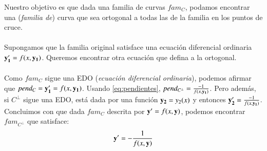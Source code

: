 Nuestro objetivo es que dada una familia de curvas $fam_{C}$, podamos encontrar una (\textit{familia de}) curva que sea ortogonal a todas las de la familia en los puntos de cruce.\\\\
Supongamos que la familia original satisface una ecuación diferencial ordinaria $\mathbf{y_1'} = f(x, \mathbf{y_1})$. Queremos encontrar otra ecuación que defina a la ortogonal.\\\\
Como $fam_{C}$ sigue una EDO (\textit{ecuación diferencial ordinaria}), podemos afirmar que $pend_{C} = \mathbf{y_1'} = f(x, \mathbf{y_1})$. Usando \ref{eq:pendientes}, $pend_{C^\perp} = \frac{-1}{f(x, \mathbf{y_1})}$. Pero además, si $C^\perp$ sigue una EDO, está dada por una función $\mathbf{y_2} = y_2(x)$ y entonces $\mathbf{y_2'} = \frac{-1}{f(x, \mathbf{y_1})}$.\\
Concluimos con que dada $fam_C$ descrita por $\mathbf{y'}=f(x,\mathbf{y})$, podemos encontrar $fam_{C^\perp}$ que satisface:
$$
    \mathbf{y'} = -\frac{1}{f(x, \mathbf{y})}
$$
